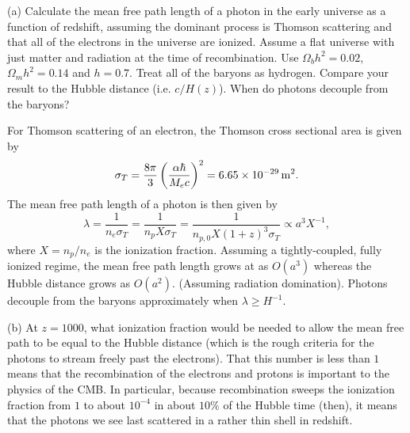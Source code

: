 \documentclass{lkx_pset}
\begin{document}
\begin{problem}{4}
\end{problem}
\begin{parts}
	\begin{part}{(a)}
		Calculate the mean free path length of a photon in the early universe as a function of redshift, assuming the dominant process is Thomson scattering and that all of the electrons in the universe are ionized. Assume a flat universe with just matter and radiation at the time of recombination. Use $\Omega_b h^2 = 0.02$, $\Omega_m h^2=0.14$ and $h=0.7$. Treat all of the baryons as hydrogen. Compare your result to the Hubble distance (i.e. $c/H(z)$). When do photons decouple from the baryons?
	\end{part}

	For Thomson scattering of an electron, the Thomson cross sectional area is given by
	\[
		\sigma_T = \frac{8\pi}{3}\left(\frac{\alpha\hbar}{M_e c}\right)^2 = \mmsi{6.65e-29}.
	\]
	The mean free path length of a photon is then given by
	\[
    \lambda = \frac{1}{n_e\sigma_T}=\frac{1}{n_pX\sigma_T} = \frac{1}{n_{p,0}X(1+z)^3 \sigma_T} \propto a^3 X^{-1},
	\]
	where $X=n_p/n_e$ is the ionization fraction. Assuming a tightly-coupled, fully ionized regime, the mean free path length grows at as $O(a^3)$ whereas the Hubble distance grows as $O(a^2)$. (Assuming radiation domination). Photons decouple from the baryons approximately when $\lambda \geq H^{-1}$.



	\begin{part}{(b)}
		At $z=1000$, what ionization fraction would be needed to allow the mean free path to be equal to the Hubble distance (which is the rough criteria for the photons to stream freely past the electrons). That this number is less than $1$ means that the recombination of the electrons and protons is important to the physics of the CMB. In particular, because recombination sweeps the ionization fraction from $1$ to about $10^{-4}$ in about $10\%$ of the Hubble time (then), it means that the photons we see last scattered in a rather thin shell in redshift.
	\end{part}


\end{parts}
\end{document}
